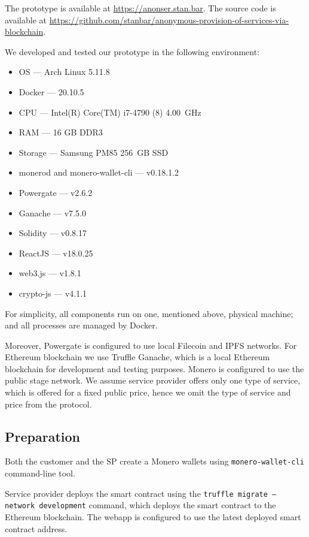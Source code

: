 \documentclass{ieeeaccess}
\begin{document}
The prototype is available at \url{https://anonser.stan.bar}. The source code is available at \url{https://github.com/stanbar/anonymous-provision-of-services-via-blockchain}.

We developed and tested our prototype in the following environment:

\begin{itemize}
  \item{OS} — Arch Linux 5.11.8
  \item{Docker} — 20.10.5
  \item{CPU} — Intel(R) Core(TM) i7-4790 (8) 4.00~GHz
  \item{RAM} — 16 GB DDR3
  \item{Storage} — Samsung PM85 256~GB SSD

  \item{monerod and monero-wallet-cli} — v0.18.1.2
  \item{Powergate} — v2.6.2
  \item{Ganache} — v7.5.0
  \item{Solidity} — v0.8.17
  \item{ReactJS} — v18.0.25
  \item{web3.js} — v1.8.1
  \item{crypto-js} — v4.1.1
\end{itemize}

For simplicity, all components run on one, mentioned above, physical machine; and all processes are managed by Docker. 

Moreover, Powergate is configured to use local Filecoin and IPFS networks.
For Ethereum blockchain we use Truffle Ganache, which is a local Ethereum blockchain for development and testing purposes. 
Monero is configured to use the public stage network.
We assume service provider offers only one type of service, which is offered for a fixed public price, hence we omit the type of service and price from the protocol.

\subsection*{Preparation}

Both the customer and the SP create a Monero wallets using \texttt{monero-wallet-cli} command-line tool.

Service provider deploys the smart contract using the \texttt{truffle migrate --network development} command, which deploys the smart contract to the Ethereum blockchain. The webapp is configured to use the latest deployed smart contract address.
\end{document}
